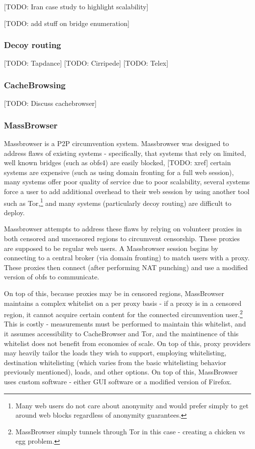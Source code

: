 \documentclass[12pt]{report}
\begin{document}
[TODO: Iran case study to highlight scalability]

[TODO: add stuff on bridge enumeration]

\subsubsection{Decoy routing}

[TODO: Tapdance] [TODO: Cirripede] [TODO: Telex]

\subsubsection{CacheBrowsing}

[TODO: Discuss cachebrowser]

\subsubsection{MassBrowser}

Massbrowser is a P2P circumvention system. Massbrowser was designed to address flaws of existing systems - specifically, that systems that rely on limited, well known bridges (such as obfs4) are easily blocked, [TODO: xref] certain systems are expensive (such as using domain fronting for a full web session), many systems offer poor quality of service due to poor scalability, several systems force a user to add additional overhead to their web session by using another tool such as Tor,\footnote{Many web users do not care about anonymity and would prefer simply to get around web blocks regardless of anonymity guarantees.} and many systems (particularly decoy routing) are difficult to deploy.\cite{massbrowser}

Massbrowser attempts to address these flaws by relying on volunteer proxies in both censored and uncensored regions to circumvent censorship. These proxies are supposed to be regular web users. A Massbrowser session begins by connecting to a central broker (via domain fronting) to match users with a proxy. These proxies then connect (after performing NAT punching) and use a modified version of obfs to communicate.

On top of this, because proxies may be in censored regions, MassBrowser maintains a complex whitelist on a per proxy basis - if a proxy is in a censored region, it cannot acquire certain content for the connected circumvention user.\footnote{MassBrowser simply tunnels through Tor in this case - creating a chicken vs egg problem.} This is costly - measurements must be performed to maintain this whitelist, and it assumes accessibility to CacheBrowser and Tor, and the maintinence of this whitelist does not benefit from economies of scale. On top of this, proxy providers may heavily tailor the loads they wish to support, employing whitelisting, destination whitelisting (which varies from the basic whitelisting behavior previously mentioned), loads, and other options.\cite{massbrowser} On top of this, MassBrowser uses custom software - either GUI software or a modified version of Firefox.
\end{document}
